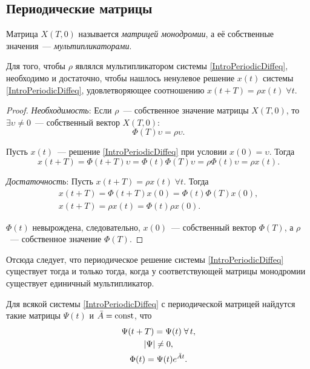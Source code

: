 \subsection{Периодические матрицы}

\begin{df}
  Матрица $X(T, 0)$ называется \emph{матрицей монодромии},
  а её собственные значения~--- \emph{мультипликаторами}.
\end{df}

\begin{stm}
  Для того, чтобы $\rho$ являлся мультипликатором
  системы \eqref{IntroPeriodicDiffeq},
  необходимо и достаточно, чтобы нашлось
  ненулевое решение $x(t)$ системы
  \eqref{IntroPeriodicDiffeq},
  удовлетворяющее соотношению $x(t + T) = \rho x(t)\;\forall t$.
\end{stm}

\begin{proof}
\emph{Необходимость}:
  Если $\rho$~--- собственное значение матрицы $X(T, 0)$,
  то $\exists \upsilon \neq 0$~--- собственный вектор $X(T, 0)$: 
  \begin{equation*}
	  \Phi(T) \upsilon = \rho \upsilon.
  \end{equation*}

  Пусть $x(t)$~--- решение \eqref{IntroPeriodicDiffeq}
  при условии $x(0) = \upsilon$. Тогда
  \begin{equation*}
	  x(t + T) = \Phi(t + T) \upsilon =
	    \Phi(t)\Phi(T) \upsilon = \rho \Phi(t) \upsilon = \rho x(t).
  \end{equation*}
  
\emph{Достаточность}:
  Пусть $x(t + T) = \rho x(t)\;\forall t$. Тогда
  \begin{gather*}
	  x(t + T) = \Phi(t + T) x(0) = \Phi(t) \Phi(T) x(0),\\
	  x(t + T) = \rho x(t) = \Phi(t) \rho x(0).
  \end{gather*}
  
  $\Phi(t)$ невырождена, следовательно,
  $x(0)$~--- собственный вектор $\Phi(T)$,
  а $\rho$~--- собственное значение $\Phi(T)$.
\end{proof}

Отсюда следует, что периодическое решение
системы \eqref{IntroPeriodicDiffeq} существует
тогда и только тогда, когда у соответствующей
матрицы монодромии существует единичный мультипликатор.

\begin{theorem}[Флоке]
  Для всякой системы \eqref{IntroPeriodicDiffeq}
  с периодической матрицей найдутся такие
  матрицы $\Psi(t)$ и $\bar{A} = \operatorname{const}$,
  что
  \begin{gather}
    \Psi(t + T) = \Psi(t) \; \forall t,\notag\\
    \abs{\Psi} \neq 0,\notag\\
  \label{IntroFlockeEq} 
	  \Phi(t) = \Psi(t) e^{\bar{A} t}.
  \end{gather}
\end{theorem}

